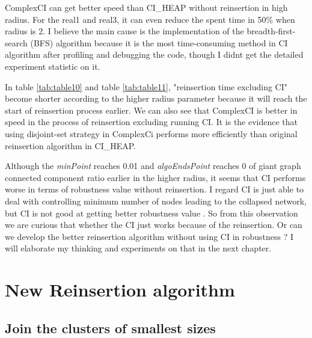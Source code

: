 \documentclass{article}
\begin{document}
\begin{enumerate}
	
		\begin{item}
			ComplexCI can get better speed than CI\_HEAP without reinsertion in high radius. For the real1 and real3, it can even reduce the spent time in 50\% when radius is 2. I believe the main cause is the implementation of the breadth-first-search (BFS) algorithm because it is the most time-consuming method in CI algorithm after profiling and debugging the code, though I didn\textquotesingle t get the detailed experiment statistic on it. 	
		\end{item}	
	
		\begin{item}	
			In table \ref{tab:table10} and table \ref{tab:table11}, "reinsertion time excluding CI" become shorter according to the higher radius parameter because it will reach the start of reinsertion process earlier. We can also see that ComplexCI is better in speed in the process of reinsertion excluding running CI. It is the evidence that using disjoint-set strategy in ComplexCi performs more efficiently than original reinsertion algorithm in CI\_HEAP. 
		\end{item}	
	
		\begin{item}	
			Although the \textit{minPoint} reaches 0.01 and \textit{algoEndsPoint} reaches 0 of giant graph connected component ratio earlier in the higher radius, it seems that CI performs worse in terms of robustness value without reinsertion. I regard CI is just able to deal with controlling minimum number of nodes leading to the collapsed network, but CI is not good at getting better robustness value . So from this observation we are curious that whether the CI just works because of the reinsertion. Or can we develop the better reinsertion algorithm without using CI in robustness ? I will elaborate my thinking and experiments on that in the next chapter.	
		\end{item}		
		
	\end{enumerate}
			

	\section{New Reinsertion algorithm}

	\subsection{Join the clusters of smallest sizes}
\end{document}

